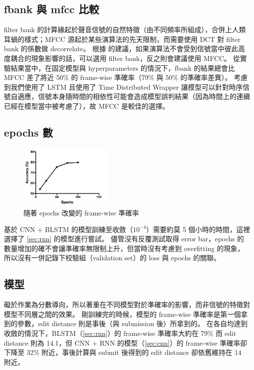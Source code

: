 \documentclass[final,3p]{elsarticle}
\begin{document}
	\subsection{fbank 與 mfcc 比較}
		filter bank 的計算緣起於聲音信號的自然特徵（由不同頻率所組成），合併上人類耳蝸的樣式；MFCC 源起於某些演算法的先天限制，而需要使用 DCT 對 filter bank 的係數做 decorrelate。
		根據 \cite{SpeechPr91:online} 的建議，如果演算法不會受到信號當中彼此高度耦合的現象影響的話，可以選用 filter bank，反之則會建議使用 MFCC。
		從實驗結果當中，在固定模型與 hyperparameters 的情況下，fbank 的結果總會比 MFCC 差了將近 50\% 的 frame-wise 準確率（79\% 與 50\% 的準確率差異）。
		考慮到我們使用了 LSTM 且使用了 Time Distributed Wrapper 讓模型可以針對時序信號自適應，信號本身隨時間的相依性可能會造成模型誤判結果（因為時間上的連續已經在模型當中被考慮了），故 MFCC 是較佳的選擇。
		
	\subsection{epochs 數}
		\begin{figure}[H]
			\centering
			\includegraphics[width=0.4\textwidth]{images/epochs_accuracy}
			\caption{隨著 epochs 改變的 frame-wise 準確率} \label{fig:epo_acc}
		\end{figure}
		基於 CNN + BLSTM 的模型訓練至收斂（$10^{-4}$）需要約莫 5 個小時的時間，這裡選擇了 \cref{sec:rnn} 的模型進行嘗試。
		儘管沒有反覆測試取得 error bar，epochs 的數量增加的確不會讓準確率無限制上升，但當時沒有考慮到 overfitting 的現象，所以沒有一併記錄下校驗組（validation set）的 loss 與 epochs 的關聯。
		
	\subsection{模型}
		礙於作業為分數導向，所以著重在不同模型對於準確率的影響，而非信號的特徵對模型不同層之間的效果。
		剛訓練完的時候，模型的 frame-wise 準確率是第一個拿到的參數，edit distance 則是事後（與 submission 後）所拿到的。
		在各自均達到收斂的情況下，BLSTM（\cref{sec:rnn}）的 frame-wise 準確率大約在 79\% 而 edit distance 則為 14.1，但 CNN + RNN 的模型（\cref{sec:cnn}）的 frame-wise 準確率卻下降至 32\% 附近，事後計算與 submit 後得到的 edit distance 卻依舊維持在 14 附近。
		
\end{document}
